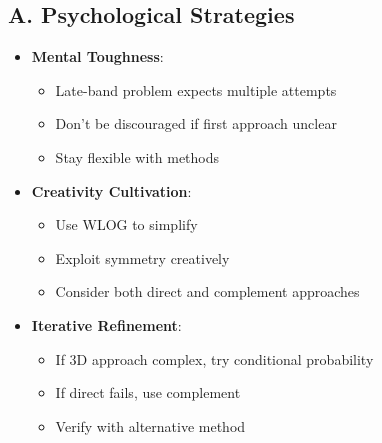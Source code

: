 \documentclass[11pt]{article}
\begin{document}
\begin{strategicbox}
\subsection*{A. Psychological Strategies}
\begin{itemize}[leftmargin=*]
    \item \textbf{Mental Toughness}: 
    \begin{itemize}
        \item Late-band problem expects multiple attempts
        \item Don't be discouraged if first approach unclear
        \item Stay flexible with methods
    \end{itemize}
    \item \textbf{Creativity Cultivation}: 
    \begin{itemize}
        \item Use WLOG to simplify
        \item Exploit symmetry creatively
        \item Consider both direct and complement approaches
    \end{itemize}
    \item \textbf{Iterative Refinement}: 
    \begin{itemize}
        \item If 3D approach complex, try conditional probability
        \item If direct fails, use complement
        \item Verify with alternative method
    \end{itemize}
\end{itemize}


\end{strategicbox}
\end{document}
